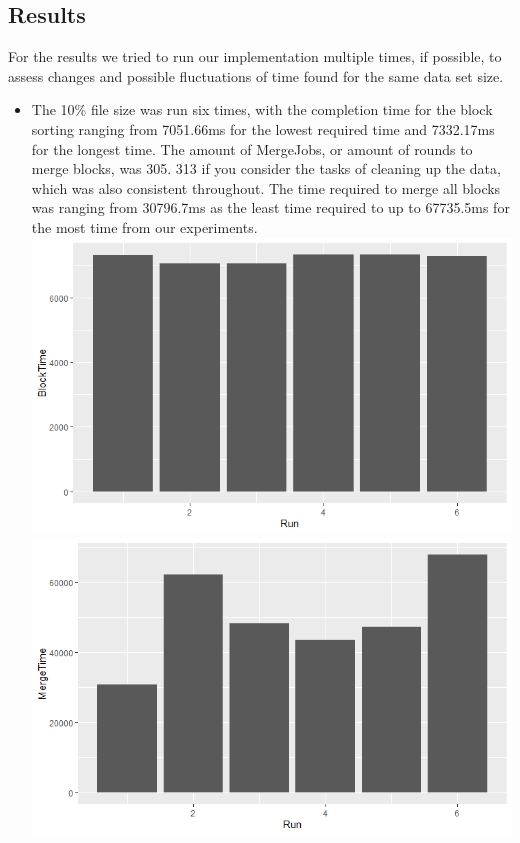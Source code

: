 \documentclass[twocolumn]{article}
\begin{document}
\subsection{Results}%
\label{sub:Results}
For the results we tried to run our implementation multiple times, if possible, to assess changes and possible fluctuations of time found for the same data set size.\\
\begin{itemize}
	\item The 10\% file size was run six times, with the completion time for the block sorting ranging from 7051.66ms for the lowest required time and 7332.17ms for the longest time. The amount of MergeJobs, or amount of rounds to merge blocks, was 305. 313 if you consider the tasks of cleaning up the data, which was also consistent throughout. The time required to merge all blocks was ranging from 30796.7ms as the least time required to up to 67735.5ms for the most time from our experiments.\\
	\includegraphics[scale=0.33]{./graph/Perc10_Block.png}
	\includegraphics[scale=0.33]{./graph/Perc10_Merge.png}

\end{itemize}
\end{document}
